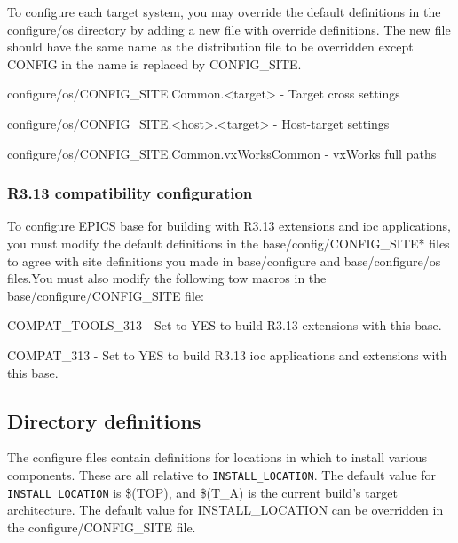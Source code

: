 To configure each target system, you may override the default definitions in the configure/os directory by adding a new 
file with override definitions. The new file should have the same name as the distribution file to be overridden except 
CONFIG in the name is replaced by CONFIG\_SITE.

\begin{description}\item configure/os/CONFIG\_SITE.Common.\textless{}target\textgreater{} - Target cross settings

\item configure/os/CONFIG\_SITE.\textless{}host\textgreater{}.\textless{}target\textgreater{} - Host-target settings

\item configure/os/CONFIG\_SITE.Common.vxWorksCommon - vxWorks full paths

\end{description}\subsubsection{R3.13 compatibility configuration}

To configure EPICS base for building with R3.13 extensions and ioc applications, you must modify the default definitions 
in the base/config/CONFIG\_SITE* files to agree with site definitions you made in base/configure and base/configure/os 
files.You must also modify the following tow macros in the base/configure/CONFIG\_SITE file:

\begin{description}\item {}COMPAT\_TOOLS\_313 - Set to YES to build R3.13 extensions with this base.

\item {}COMPAT\_313 - Set to YES to build R3.13 ioc applications and extensions with this base.

\end{description}\subsection{Directory definitions}

The configure files contain definitions for locations in which to install various components. These are all relative to 
\verb|INSTALL_LOCATION|. The default value for \verb|INSTALL_LOCATION| is \$(TOP), and \$(T\_A) is the current build's target 
architecture. The default value for INSTALL\_LOCATION can be overridden in the configure/CONFIG\_SITE file. 

